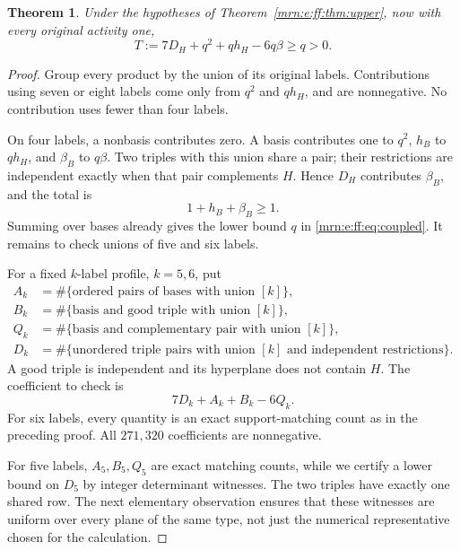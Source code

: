 \documentclass[11pt,a4paper]{article}
\newtheorem{theorem}{Theorem}[section]
\theoremstyle{remark}\newtheorem{remark}[theorem]{Remark}
\begin{document}
\begin{theorem}\label{mrn:e:ff:thm:coupled}
Under the hypotheses of Theorem~\ref{mrn:e:ff:thm:upper}, now with every original activity one,
\begin{equation}\label{mrn:e:ff:eq:coupled}
 T:=7D_H+q^2+qh_H-6q\beta\ge q>0.
\end{equation}
\end{theorem}
\begin{proof}
Group every product by the union of its original labels. Contributions using seven or eight labels come only from $q^2$ and $qh_H$, and are nonnegative. No contribution uses fewer than four labels.

On four labels, a nonbasis contributes zero. A basis contributes one to $q^2$, $h_B$ to $qh_H$, and $\beta_B$ to $q\beta$. Two triples with this union share a pair; their restrictions are independent exactly when that pair complements $H$. Hence $D_H$ contributes $\beta_B$, and the total is
\[
 1+h_B+\beta_B\ge1.
\]
Summing over bases already gives the lower bound $q$ in \eqref{mrn:e:ff:eq:coupled}. It remains to check unions of five and six labels.

For a fixed $k$-label profile, $k=5,6$, put
\begin{align*}
 A_k&=\#\{\text{ordered pairs of bases with union }[k]\},\\
 B_k&=\#\{\text{basis and good triple with union }[k]\},\\
 Q_k&=\#\{\text{basis and complementary pair with union }[k]\},\\
 D_k&=\#\{\text{unordered triple pairs with union }[k]
       \text{ and independent restrictions}\}.
\end{align*}
A good triple is independent and its hyperplane does not contain $H$. The coefficient to check is
\begin{equation}\label{mrn:e:ff:eq:coefficient}
 7D_k+A_k+B_k-6Q_k.
\end{equation}
For six labels, every quantity is an exact support-matching count as in the preceding proof. All $271{,}320$ coefficients are nonnegative.

For five labels, $A_5,B_5,Q_5$ are exact matching counts, while we certify a lower bound on $D_5$ by integer determinant witnesses. The two triples have exactly one shared row. The next elementary observation ensures that these witnesses are uniform over every plane of the same type, not just the numerical representative chosen for the calculation.


\end{proof}
\end{document}
